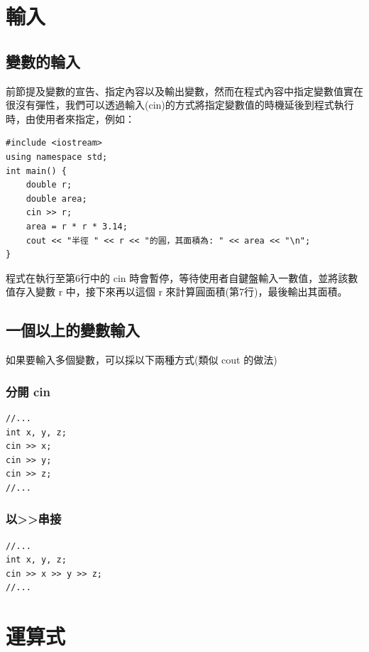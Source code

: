 \documentclass[12pt,a4paper]{article}
\begin{document}
\section{輸入}
\label{cpp_input}
\subsection{變數的輪入}
\label{sec:orgc55f45a}
前節提及變數的宣告、指定內容以及輸出變數，然而在程式內容中指定變數值實在很沒有彈性，我們可以透過輸入(cin)的方式將指定變數值的時機延後到程式執行時，由使用者來指定，例如：

\lstset{breaklines=true,language=cpp,label= ,caption= ,captionpos=b,firstnumber=1,numbers=left}
\begin{lstlisting}
#include <iostream>
using namespace std;
int main() {
    double r;
    double area;
    cin >> r;
    area = r * r * 3.14;
    cout << "半徑 " << r << "的圓，其面積為: " << area << "\n";
}
\end{lstlisting}

程式在執行至第6行中的 cin 時會暫停，等待使用者自鍵盤輸入一數值，並將該數值存入變數 r 中，接下來再以這個 r 來計算圓面積(第7行)，最後輸出其面積。

\subsection{一個以上的變數輸入}
\label{sec:org97f6cf8}
如果要輸入多個變數，可以採以下兩種方式(類似 cout 的做法)
\subsubsection{分開 cin}
\label{sec:org641caca}
\lstset{breaklines=true,language=cpp,label= ,caption= ,captionpos=b,firstnumber=1,numbers=left}
\begin{lstlisting}
//...
int x, y, z;
cin >> x;
cin >> y;
cin >> z;
//...
\end{lstlisting}

\subsubsection{以>>串接}
\label{sec:orgf1c9ee1}
\lstset{breaklines=true,language=cpp,label= ,caption= ,captionpos=b,firstnumber=1,numbers=left}
\begin{lstlisting}
//...
int x, y, z;
cin >> x >> y >> z;
//...
\end{lstlisting}

\section{運算式}
\label{cpp_operation}
\end{document}
